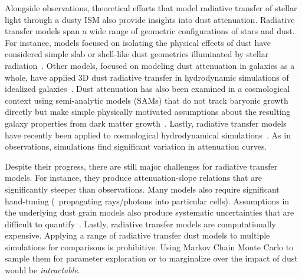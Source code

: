 Alongside observations, theoretical efforts that model radiative transfer of
stellar light through a dusty ISM also provide insights into dust attenuation.
Radiative transfer models span a wide range of geometric configurations of
stars and dust. For instance, models focused on isolating the physical effects
of dust have considered simple slab or shell-like dust geometries illuminated
by stellar radiation~\citep[\eg][]{witt1996, witt2000, seon2016}. Other models,
focused on modeling dust attenuation in galaxies as a whole, have applied 3D
dust radiative transfer in hydrodynamic simulations of idealized
galaxies~\citep[\eg][]{jonsson2006, rocha2008, hayward2015, natale2015,
hou2017}. Dust attenuation has also been examined in a cosmological context
using semi-analytic models (SAMs) that do not track baryonic growth directly 
but make simple physically motivated assumptions about the resulting galaxy
properties from dark matter growth~\citep[\eg][]{granato2000,
fontanot2009, wilkins2012, gonzalez-perez2013, popping2017}. Lastly, radiative transfer
models have recently been applied to cosmological hydrodynamical
simulations~\cite[\eg][]{camps2015, narayanan2018, trayford2020}. As in
observations, simulations find significant variation in attenuation
curves. %

Despite their progress, there are still major challenges for radiative
transfer models. For instance, they produce attenuation-slope relations that
are significantly steeper than observations. Many models also require
significant hand-tuning (\eg~propagating rays/photons into
particular cells). Assumptions in the underlying dust grain models also produce
systematic uncertainties that are difficult to quantify~\citep[see][for a
review]{steinacker2013}. Lastly, radiative transfer models 
are computationally expensive. Applying a range of radiative transfer dust
models to multiple simulations for comparisons is prohibitive. Using Markov
Chain Monte Carlo to sample them for parameter exploration or to marginalize
over the impact of dust would be {\em intractable}. 

